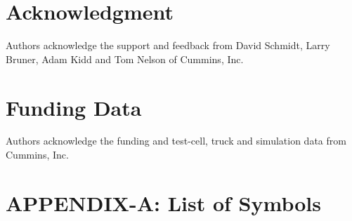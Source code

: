 \documentclass[subscriptcorrection,upint,varvw,barcolor=Goldenrod3,mathalfa=cal=euler,balance,hyphenate,french,pdf-a]{asmejour}
\begin{document}
\section*{Acknowledgment}
Authors acknowledge the support and feedback from David Schmidt, Larry
Bruner, Adam Kidd and Tom Nelson of Cummins, Inc.
\section*{Funding Data}
Authors acknowledge the funding and test-cell, truck and simulation data from Cummins, Inc.

\appendix   %
\section{APPENDIX-A: List of Symbols}



\end{document}
